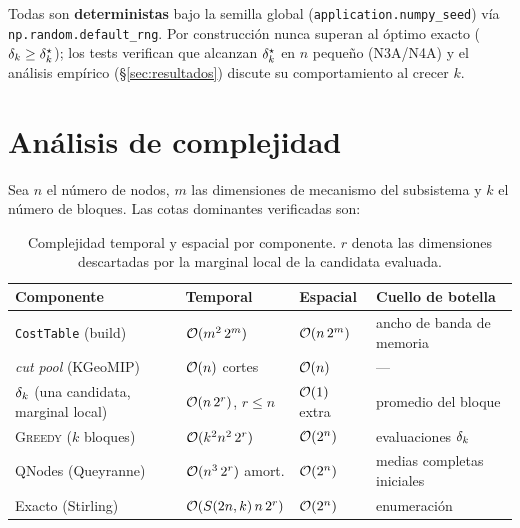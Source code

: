 \documentclass[11pt,letterpaper]{article}
\begin{document}
Todas son \textbf{deterministas} bajo la semilla global
(\texttt{application.numpy\_seed}) vía \texttt{np.random.default\_rng}. Por
construcción nunca superan al óptimo exacto ($\delta_k \ge \delta_k^\star$); los tests
verifican que alcanzan $\delta_k^\star$ en $n$ pequeño (N3A/N4A) y el análisis empírico
(§\ref{sec:resultados}) discute su comportamiento al crecer $k$.

\section{Análisis de complejidad}
\label{sec:complejidad}

Sea $n$ el número de nodos, $m$ las dimensiones de mecanismo del subsistema y $k$
el número de bloques. Las cotas dominantes verificadas son:

\begin{table}[H]
	\centering\footnotesize
	\caption{Complejidad temporal y espacial por componente. $r$ denota las
		dimensiones descartadas por la marginal local de la candidata evaluada.}
	\begin{tabular}{@{}llll@{}}
		\toprule
		Componente                            & Temporal                     & Espacial          & Cuello de botella          \\
		\midrule
		\texttt{CostTable} (build)            & $\mathcal{O}(m^2\,2^{m})$          & $\mathcal{O}(n\,2^{m})$ & ancho de banda de memoria  \\
		\emph{cut pool} (KGeoMIP)             & $\mathcal{O}(n)$ cortes            & $\mathcal{O}(n)$        & ---                        \\
		$\delta_k$ (una candidata, marginal local) & $\mathcal{O}(n\,2^{r})$, $r\le n$  & $\mathcal{O}(1)$ extra  & promedio del bloque        \\
		\textsc{Greedy} ($k$ bloques)         & $\mathcal{O}(k^{2} n^2\, 2^{r})$   & $\mathcal{O}(2^{n})$    & evaluaciones $\delta_k$         \\
		QNodes (Queyranne)                    & $\mathcal{O}(n^{3}\,2^{r})$ amort. & $\mathcal{O}(2^{n})$    & medias completas iniciales \\
		Exacto (Stirling)                     & $\mathcal{O}(S(2n,k)\,n\,2^{r})$   & $\mathcal{O}(2^{n})$    & enumeración                \\
		\bottomrule
	\end{tabular}
	\label{tab:complejidad}
\end{table}
\end{document}
